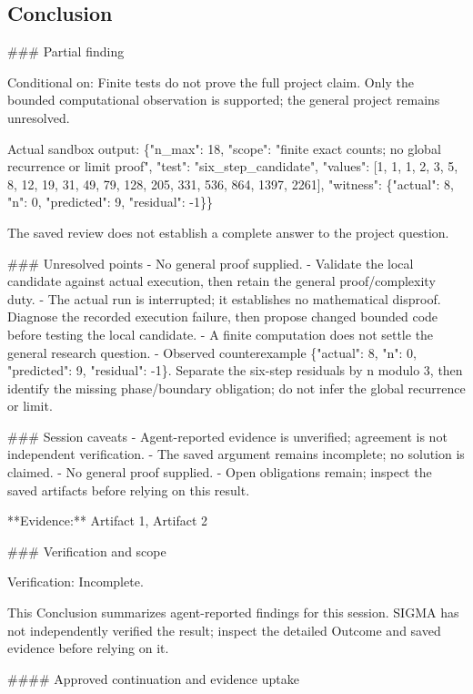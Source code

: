\documentclass[11pt]{article}
\begin{document}
\subsection{Conclusion}
\#\#\# Partial finding

Conditional on: Finite tests do not prove the full project claim. Only the bounded computational observation is supported; the general project remains unresolved.

Actual sandbox output: \{"n\_max": 18, "scope": "finite exact counts; no global recurrence or limit proof", "test": "six\_step\_candidate", "values": [1, 1, 1, 2, 3, 5, 8, 12, 19, 31, 49, 79, 128, 205, 331, 536, 864, 1397, 2261], "witness": \{"actual": 8, "n": 0, "predicted": 9, "residual": -1\}\}

The saved review does not establish a complete answer to the project question.

\#\#\# Unresolved points
- No general proof supplied.
- Validate the local candidate against actual execution, then retain the general proof/complexity duty.
- The actual run is interrupted; it establishes no mathematical disproof. Diagnose the recorded execution failure, then propose changed bounded code before testing the local candidate.
- A finite computation does not settle the general research question.
- Observed counterexample \{"actual": 8, "n": 0, "predicted": 9, "residual": -1\}. Separate the six-step residuals by n modulo 3, then identify the missing phase/boundary obligation; do not infer the global recurrence or limit.

\#\#\# Session caveats
- Agent-reported evidence is unverified; agreement is not independent verification.
- The saved argument remains incomplete; no solution is claimed.
- No general proof supplied.
- Open obligations remain; inspect the saved artifacts before relying on this result.

**Evidence:** Artifact 1, Artifact 2

\#\#\# Verification and scope

Verification: Incomplete.

This Conclusion summarizes agent-reported findings for this session. SIGMA has not independently verified the result; inspect the detailed Outcome and saved evidence before relying on it.

\#\#\#\# Approved continuation and evidence uptake
\end{document}

